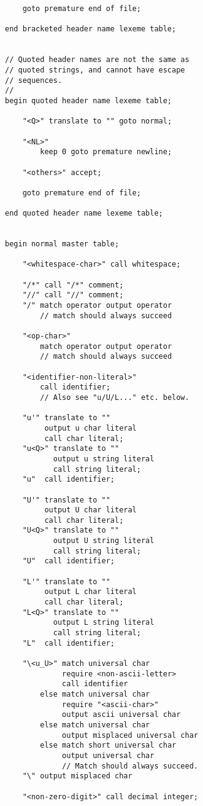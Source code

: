 \documentclass[12pt]{article}
\newenvironment{indpar}[1][0.3in]%
	{\begin{list}{}%
		     {\setlength{\itemsep}{0in}%
		      \setlength{\topsep}{0in}%
		      \setlength{\parsep}{1ex}%
		      \setlength{\labelwidth}{#1}%
		      \setlength{\leftmargin}{#1}%
		      \addtolength{\leftmargin}{\labelsep}}%
	 \item}%
	{\end{list}}
\begin{document}
\begin{indpar}
\begin{verbatim}
    goto premature end of file;

end bracketed header name lexeme table;


// Quoted header names are not the same as
// quoted strings, and cannot have escape
// sequences.
//
begin quoted header name lexeme table;

    "<Q>" translate to "" goto normal;

    "<NL>"
        keep 0 goto premature newline;

    "<others>" accept;

    goto premature end of file;

end quoted header name lexeme table;


begin normal master table;

    "<whitespace-char>" call whitespace;

    "/*" call "/*" comment;
    "//" call "//" comment;
    "/" match operator output operator
        // match should always succeed

    "<op-char>"
        match operator output operator
        // match should always succeed

    "<identifier-non-literal>"
        call identifier;
        // Also see "u/U/L..." etc. below.

    "u'" translate to ""
         output u char literal
         call char literal;
    "u<Q>" translate to ""
           output u string literal
           call string literal;
    "u"  call identifier;

    "U'" translate to ""
         output U char literal
         call char literal;
    "U<Q>" translate to ""
           output U string literal
           call string literal;
    "U"  call identifier;

    "L'" translate to ""
         output L char literal
         call char literal;
    "L<Q>" translate to ""
           output L string literal
           call string literal;
    "L"  call identifier;

    "\<u_U>" match universal char
             require <non-ascii-letter>
             call identifier
        else match universal char
             require "<ascii-char>"
             output ascii universal char
        else match universal char
             output misplaced universal char
        else match short universal char
             output universal char
             // Match should always succeed.
    "\" output misplaced char

    "<non-zero-digit>" call decimal integer;


\end{verbatim}
\end{indpar}
\end{document}
